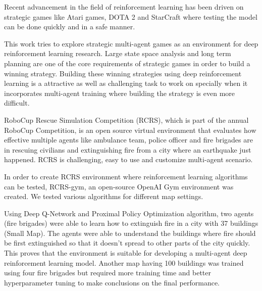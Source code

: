 \documentclass[12pt]{report}
\begin{document}
\begin{thesisabstract}               

Recent advancement in the field of reinforcement learning has been driven on strategic games like Atari games, DOTA 2 and StarCraft where testing the model can be done quickly and in a safe manner. 

This work tries to explore strategic multi-agent games as an environment for deep reinforcement learning research. Large state space analysis and long term planning are one of the core requirements of strategic games in order to build a winning strategy. Building these winning strategies using deep reinforcement learning is a attractive as well as challenging task to work on specially when it incorporates multi-agent training where building the strategy is even more difficult. 

RoboCup Rescue Simulation Competition (RCRS), which is part of the annual RoboCup Competition, is an open source virtual environment that evaluates how effective multiple agents like ambulance team, police officer and fire brigades are in rescuing civilians and extinguishing fire from a city where an earthquake just happened. RCRS is challenging, easy to use and customize multi-agent scenario. 

In order to create RCRS environment where reinforcement learning algorithms can be tested, RCRS-gym, an open-source OpenAI Gym environment was created. We tested various algorithms for different map settings. 

Using Deep Q-Network and Proximal Policy Optimization algorithm, two agents (fire brigades) were able to learn how to extinguish fire in a city with 37 buildings (Small Map). The agents were able to understand the buildings where fire should be first extinguished so that it doesn't spread to other parts of the city quickly. This proves that the environment is suitable for developing a multi-agent deep reinforcement learning model. Another map having 100 buildings was trained using four fire brigades but required more training time and better hyperparameter tuning to make conclusions on the final performance.   
                                
\end{thesisabstract}                 

\tableofcontents                     

\newpage

%
\listoffigures
\newpage
{}%
\listofalgorithms
\newpage
{}%
\listoftables
\newpage
\end{document}
